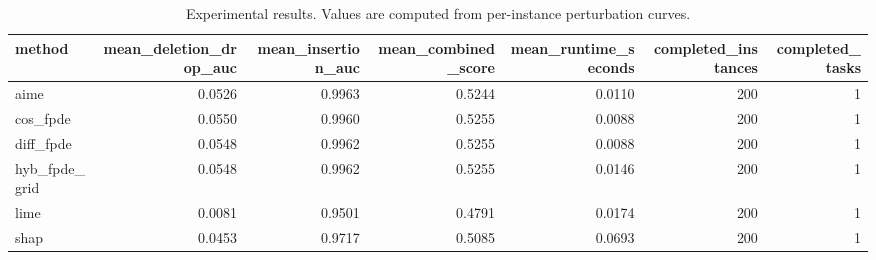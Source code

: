 \begin{table}[t]
\caption{Experimental results. Values are computed from per-instance perturbation curves.}
\label{tab:main_results_computed}
\centering
\begin{tabular}{lrrrrrr}
\toprule
method & mean\_deletion\_drop\_auc & mean\_insertion\_auc & mean\_combined\_score & mean\_runtime\_seconds & completed\_instances & completed\_tasks \\
\midrule
aime & 0.0526 & 0.9963 & 0.5244 & 0.0110 & 200 & 1 \\
cos\_fpde & 0.0550 & 0.9960 & 0.5255 & 0.0088 & 200 & 1 \\
diff\_fpde & 0.0548 & 0.9962 & 0.5255 & 0.0088 & 200 & 1 \\
hyb\_fpde\_grid & 0.0548 & 0.9962 & 0.5255 & 0.0146 & 200 & 1 \\
lime & 0.0081 & 0.9501 & 0.4791 & 0.0174 & 200 & 1 \\
shap & 0.0453 & 0.9717 & 0.5085 & 0.0693 & 200 & 1 \\
\bottomrule
\end{tabular}

\end{table}
